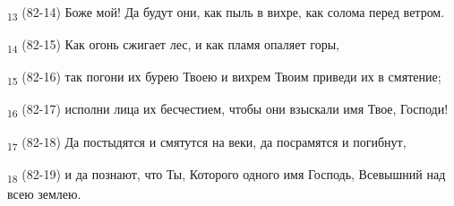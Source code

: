 \begin{tcolorbox}
\textsubscript{13} (82-14) Боже мой! Да будут они, как пыль в вихре, как солома перед ветром.
\end{tcolorbox}
\begin{tcolorbox}
\textsubscript{14} (82-15) Как огонь сжигает лес, и как пламя опаляет горы,
\end{tcolorbox}
\begin{tcolorbox}
\textsubscript{15} (82-16) так погони их бурею Твоею и вихрем Твоим приведи их в смятение;
\end{tcolorbox}
\begin{tcolorbox}
\textsubscript{16} (82-17) исполни лица их бесчестием, чтобы они взыскали имя Твое, Господи!
\end{tcolorbox}
\begin{tcolorbox}
\textsubscript{17} (82-18) Да постыдятся и смятутся на веки, да посрамятся и погибнут,
\end{tcolorbox}
\begin{tcolorbox}
\textsubscript{18} (82-19) и да познают, что Ты, Которого одного имя Господь, Всевышний над всею землею.
\end{tcolorbox}
